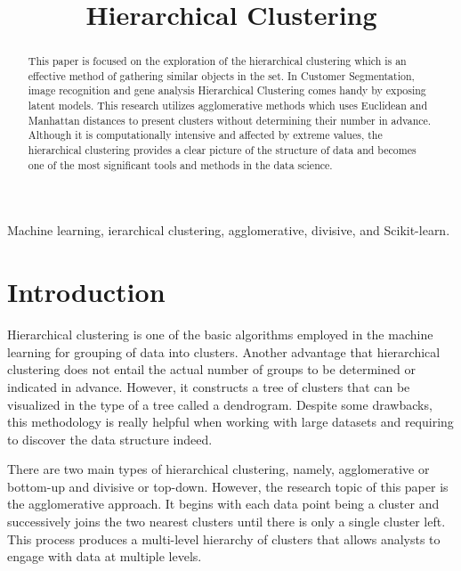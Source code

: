 \documentclass[conference]{IEEEtran}
\begin{document}
\title{Hierarchical Clustering}
\author{
}
\maketitle

\begin{abstract}
This paper is focused on the exploration of the hierarchical clustering which is an effective method of gathering similar objects in the set. In Customer Segmentation, image recognition and gene analysis Hierarchical Clustering comes handy by exposing latent models. This research utilizes agglomerative methods which uses Euclidean and Manhattan distances to present clusters without determining their number in advance. Although it is computationally intensive and affected by extreme values, the hierarchical clustering provides a clear picture of the structure of data and becomes one of the most significant tools and methods in the data science.
\end{abstract}

\begin{IEEEkeywords}
Machine learning, ierarchical clustering, agglomerative, divisive, and Scikit-learn.
\end{IEEEkeywords}

\section{Introduction}
Hierarchical clustering is one of the basic algorithms employed in the machine learning for grouping of data into clusters. Another advantage that hierarchical clustering does not entail the actual number of groups to be determined or indicated in advance. However, it constructs a tree of clusters that can be visualized in the type of a tree called a dendrogram. Despite some drawbacks, this methodology is really helpful when working with large datasets and requiring to discover the data structure indeed.

There are two main types of hierarchical clustering, namely, agglomerative or bottom-up and divisive or top-down. However, the research topic of this paper is the agglomerative approach. It begins with each data point being a cluster and successively joins the two nearest clusters until there is only a single cluster left. This process produces a multi-level hierarchy of clusters that allows analysts to engage with data at multiple levels.\cite{nielsen2016introduction}
\end{document}
